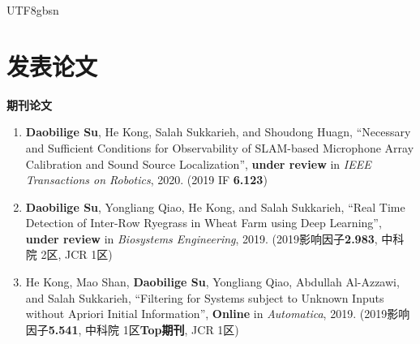 \documentclass[margin,line]{res}
\begin{document}
\begin{CJK*}{UTF8}{gbsn}
\begin{resume}
\begin{itemize}
%

\end{itemize}






\section{\sc 发表论文}
%
%
\textbf{期刊论文}

\begin{enumerate}

\item \textbf{Daobilige Su}, He Kong, Salah Sukkarieh, and Shoudong Huagn, ``Necessary and Sufficient Conditions for Observability of SLAM-based Microphone Array Calibration and Sound Source Localization'', \textbf{under review} in \textit{IEEE Transactions on Robotics}, 2020. (2019 IF  \textbf{6.123})

\item \textbf{Daobilige Su}, Yongliang Qiao, He Kong, and Salah Sukkarieh, ``Real Time Detection of Inter-Row Ryegrass in Wheat Farm using Deep Learning'', \textbf{under review} in \textit{Biosystems Engineering}, 2019. (2019影响因子\textbf{2.983}, 中科院 2区, JCR 1区)

\item He Kong, Mao Shan, \textbf{Daobilige Su}, Yongliang Qiao, Abdullah Al-Azzawi, and Salah Sukkarieh, ``Filtering for Systems subject to Unknown Inputs without Apriori Initial Information'', \textbf{Online} in \textit{Automatica}, 2019. (2019影响因子\textbf{5.541}, 中科院 1区\textbf{Top期刊}, JCR 1区)


\end{enumerate}
\end{resume}
\end{CJK*}
\end{document}
